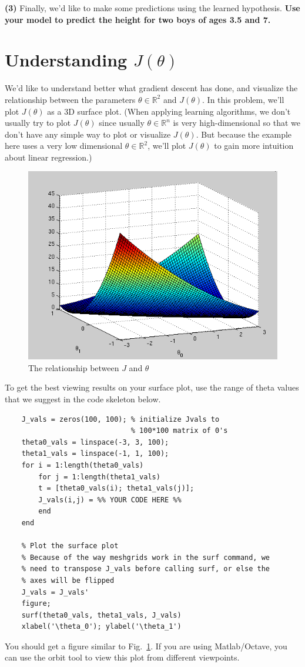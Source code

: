 \documentclass[10pt,a4paper]{article}
\begin{document}
  \vspace{2ex}
  \noindent\textbf{(3)} Finally, we'd like to make some predictions using the learned hypothesis. \textbf{Use your model to predict the height for two boys of ages 3.5 and 7.}


\section{Understanding $J(\theta)$}
%
  We'd like to understand better what gradient descent has done, and visualize the relationship between the parameters  $\theta \in {\mathbb R}^2$ and $J(\theta)$. In this problem, we'll plot $J(\theta)$ as a 3D surface plot. (When applying learning algorithms, we don't usually try to plot $J(\theta)$ since usually  $\theta \in {\mathbb R}^n$ is very high-dimensional so that we don't have any simple way to plot or visualize $J(\theta)$. But because the example here uses a very low dimensional  $\theta \in {\mathbb R}^2$, we'll plot $J(\theta)$ to gain more intuition about linear regression.)

  \begin{figure}[htb!]
    \centering
      \includegraphics[width=.6\columnwidth]{ex2surf}
      \caption{The relationship between $J$ and $\theta$}
      \label{fig:surf}
  \end{figure}

  To get the best viewing results on your surface plot, use the range of theta values that we suggest in the code skeleton below.
  \begin{lstlisting}
    J_vals = zeros(100, 100); % initialize Jvals to
                              % 100*100 matrix of 0's
    theta0_vals = linspace(-3, 3, 100);
    theta1_vals = linspace(-1, 1, 100);
    for i = 1:length(theta0_vals)
        for j = 1:length(theta1_vals)
        t = [theta0_vals(i); theta1_vals(j)];
        J_vals(i,j) = %% YOUR CODE HERE %%
        end
    end

    % Plot the surface plot
    % Because of the way meshgrids work in the surf command, we 
    % need to transpose J_vals before calling surf, or else the 
    % axes will be flipped
    J_vals = J_vals'
    figure;
    surf(theta0_vals, theta1_vals, J_vals)
    xlabel('\theta_0'); ylabel('\theta_1')
  \end{lstlisting}
  You should get a figure similar to Fig.~\ref{fig:surf}. If you are using Matlab/Octave, you can use the orbit tool to view this plot from different viewpoints.
  
\end{document}
